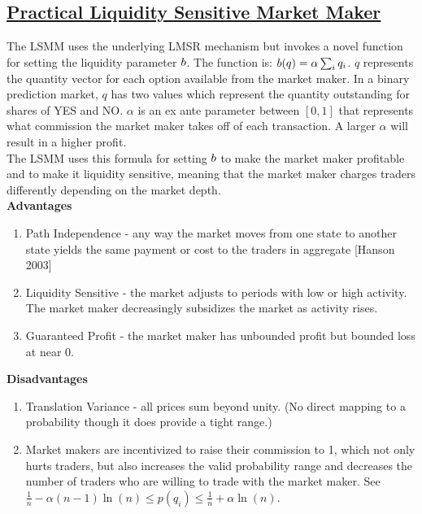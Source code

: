 \subsection{\href{https://www.cs.cmu.edu/~sandholm/liquidity-sensitive automated market maker.teac.pdf}{Practical Liquidity Sensitive Market Maker}}
The LSMM uses the underlying LMSR mechanism but invokes a novel
function for setting the liquidity parameter $b$. The function is:
$b(q) = \alpha \sum_{i} q_i$. $q$ represents the quantity vector
for each option available from the market maker. In a binary
prediction market, $q$ has two values which represent the quantity
outstanding for shares of YES and NO. $\alpha$ is an ex ante parameter 
between $[0,1]$ that represents what commission the market maker takes
off of each transaction. A larger $\alpha$ will result in a higher
profit.\\

The LSMM uses this formula for setting $b$ to make the market
maker profitable and to make it liquidity sensitive, meaning that
the market maker charges traders differently depending on the market
depth. \\

\textbf{Advantages}\\
\begin{enumerate}
\item{Path Independence - any way the market moves from one state to another state yields the same payment or cost to the traders in aggregate [Hanson 2003]}
\item{Liquidity Sensitive - the market adjusts to periods with low or high activity. The market maker decreasingly subsidizes the market as activity rises.}
\item{Guaranteed Profit - the market maker has unbounded profit but bounded
loss at near 0.}
\end{enumerate}

\textbf{Disadvantages} \\
\begin{enumerate}
\item{Translation Variance - all prices sum beyond unity. (No direct mapping to a probability though it does provide a tight range.)}
\item Market makers are incentivized to raise their commission to 1, which not only hurts traders, but also increases the valid probability range
and decreases the number of traders who are willing to trade with the market maker. See $\frac{1}{n} - \alpha(n - 1)\ln(n) \leq p(q_i) \leq \frac{1}{n} + \alpha\ln(n)$.
\end{enumerate}

